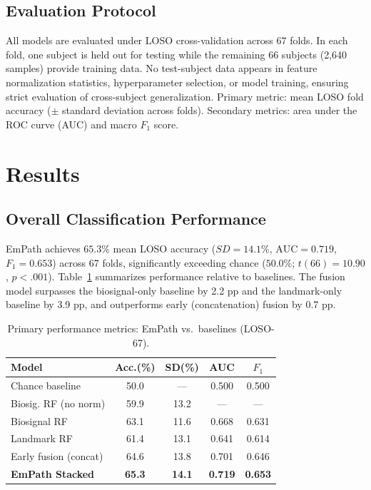 \documentclass[sigconf]{acmart}
\begin{document}
\subsection{Evaluation Protocol}

All models are evaluated under LOSO cross-validation across 67 folds. In each
fold, one subject is held out for testing while the remaining 66 subjects
(2,640 samples) provide training data. No test-subject data appears in feature
normalization statistics, hyperparameter selection, or model training, ensuring
strict evaluation of cross-subject generalization. Primary metric: mean LOSO
fold accuracy ($\pm$ standard deviation across folds). Secondary metrics:
area under the ROC curve (AUC) and macro $F_1$ score.

\section{Results}
\label{sec:results}

\subsection{Overall Classification Performance}

EmPath achieves $\mathbf{65.3\%}$ mean LOSO accuracy ($SD = 14.1\%$,
$\text{AUC} = 0.719$, $F_1 = 0.653$) across 67 folds, significantly exceeding
chance ($50.0\%$; $t(66) = 10.90$, $p < .001$). Table~\ref{tab:results}
summarizes performance relative to baselines. The fusion model surpasses the
biosignal-only baseline by 2.2 pp and the landmark-only baseline by 3.9 pp,
and outperforms early (concatenation) fusion by 0.7 pp.

\begin{table}[t]
\centering
\caption{Primary performance metrics: EmPath vs.\ baselines (LOSO-67).}
\label{tab:results}
\begin{tabular}{@{}lcccc@{}}
\toprule
Model & Acc.(\%) & SD(\%) & AUC & $F_1$ \\
\midrule
Chance baseline        & 50.0 & ---  & 0.500 & 0.500 \\
Biosig. RF (no norm)   & 59.9 & 13.2 & ---   & ---   \\
Biosignal RF           & 63.1 & 11.6 & 0.668 & 0.631 \\
Landmark RF            & 61.4 & 13.1 & 0.641 & 0.614 \\
Early fusion (concat)  & 64.6 & 13.8 & 0.701 & 0.646 \\
\textbf{EmPath Stacked}& \textbf{65.3} & \textbf{14.1} & \textbf{0.719} & \textbf{0.653} \\
\bottomrule
\end{tabular}
\end{table}
\end{document}
